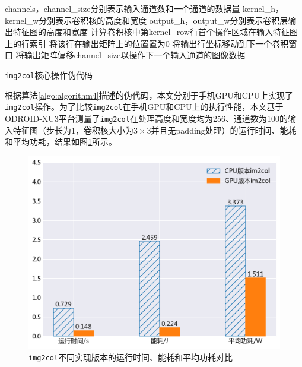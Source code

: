 \begin{algorithm}[htbp]
  \small
  \SetAlgoLined
    \begin{spacing}{0.8}
    channels，channel\_size分别表示输入通道数和一个通道的数据量\;
    kernel\_h，kernel\_w分别表示卷积核的高度和宽度\;
  output\_h，output\_w分别表示卷积层输出特征图的高度和宽度\;
     {
         {
             {
                计算卷积核中第kernel\_row行首个操作区域在输入特征图上的行索引\;
                 {
                     {
                         {
                            将该行在输出矩阵上的位置置为0\;
                        }
                    } 
                    将输出行坐标移动到下一个卷积窗口\;
                }
            }
        }
        将输出矩阵偏移channel\_size以操作下一个输入通道的图像数据\;
    }
    \end{spacing}
  \caption{\texttt{img2col}核心操作伪代码}
  \label{algo:algorithm4}
\end{algorithm}

根据算法\ref{algo:algorithm4}描述的伪代码，本文分别于手机GPU和CPU上实现了\texttt{img2col}操作。为了比较\texttt{img2col}在手机GPU和CPU上的执行性能，本文基于ODROID-XU3平台测量了\texttt{img2col}在处理高度和宽度均为256、通道数为100的输入特征图（步长为1，卷积核大小为$3 \times 3$并且无padding处理）的运行时间、能耗和平均功耗，结果如图\ref{figure:figure11}所示。

\begin{figure}[htbp]
    \begin{center}
    \includegraphics[height=0.4\textwidth]{figures/im2col_energy.pdf}
    \end{center}
    \caption{\texttt{img2col}不同实现版本的运行时间、能耗和平均功耗对比}\label{figure:figure11}
\end{figure}

